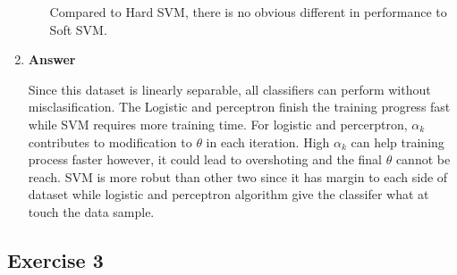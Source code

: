 \documentclass[11pt]{article}
\begin{document}
\begin{enumerate}[label=(\alph*)]
\begin{enumerate}[label=(\roman*)]
Compared to Hard SVM, there is no obvious different in performance to Soft SVM.

\end{enumerate}



\item  \textbf{Answer}

Since this dataset is linearly separable, all classifiers can perform without misclasification. The Logistic and perceptron finish the training progress fast while SVM requires more training time. For logistic and percerptron, $\alpha_k$ contributes to modification to $\theta$ in each iteration. High $\alpha_k$ can help training process faster however, it could lead to overshoting and the final $\theta$ cannot be reach. SVM is more robut than other two since it has margin to each side of dataset while logistic and perceptron algorithm give the classifer what at touch the data sample. 

\end{enumerate}

\newpage 


\subsection*{Exercise 3}
\end{document}
